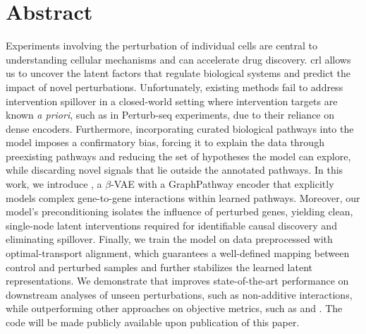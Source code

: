 \documentclass[10pt,letterpaper]{article}
\theoremstyle{definition}
\theoremstyle{remark}
\newcommand{\apriori}{\emph{a priori}}
\newcommand{\betavae}{$\beta$-VAE}
\begin{document}
\section*{Abstract}
Experiments involving the perturbation of individual cells are central to understanding cellular mechanisms and can accelerate drug discovery.
\Gls{crl} allows us to uncover the latent factors that regulate biological systems and predict the impact of novel perturbations.
Unfortunately, existing methods fail to address intervention spillover in a closed-world setting where intervention targets are known \apriori, such as in Perturb-seq experiments, due to their reliance on dense encoders.
Furthermore, incorporating curated biological pathways into the model imposes a confirmatory bias, forcing it to explain the data through preexisting pathways and reducing the set of hypotheses the model can explore, while discarding novel signals that lie outside the annotated pathways.
In this work, we introduce , a \betavae{} with a GraphPathway encoder that explicitly models complex gene-to-gene interactions within learned pathways.
Moreover, our model's preconditioning isolates the influence of perturbed genes, yielding clean, single-node latent interventions required for identifiable causal discovery and eliminating spillover.
Finally, we train the model on data preprocessed with optimal-transport alignment, which guarantees a well-defined mapping between control and perturbed samples and further stabilizes the learned latent representations.
We demonstrate that  improves state-of-the-art performance on downstream analyses of unseen perturbations, such as non-additive interactions, while outperforming other approaches on objective metrics, such as  and .
The code will be made publicly available upon publication of this paper.

\end{document}
